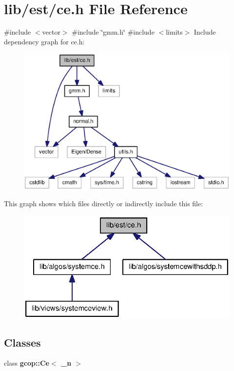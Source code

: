 \section{lib/est/ce.h \-File \-Reference}
\label{ce_8h}
{\ttfamily \#include $<$vector$>$}\*
{\ttfamily \#include \char`\"{}gmm.\-h\char`\"{}}\*
{\ttfamily \#include $<$limits$>$}\*
\-Include dependency graph for ce.\-h\-:
\nopagebreak
\begin{figure}[H]
\begin{center}
\leavevmode
\includegraphics[width=350pt]{ce_8h__incl}
\end{center}
\end{figure}
\-This graph shows which files directly or indirectly include this file\-:
\nopagebreak
\begin{figure}[H]
\begin{center}
\leavevmode
\includegraphics[width=325pt]{ce_8h__dep__incl}
\end{center}
\end{figure}
\subsection*{\-Classes}
\begin{DoxyCompactItemize}
\item 
class {\bf gcop\-::\-Ce$<$ \-\_\-n $>$}
\end{DoxyCompactItemize}
